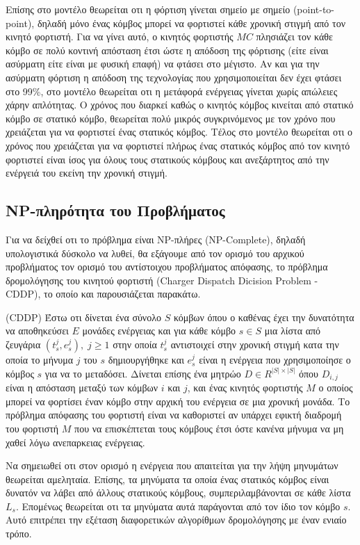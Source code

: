 Επίσης στο μοντέλο θεωρείται οτι η φόρτιση γίνεται σημείο με σημείο (point-to-point), δηλαδή μόνο ένας κόμβος μπορεί να φορτιστεί κάθε χρονική στιγμή από τον κινητό
φορτιστή. Για να γίνει αυτό, ο κινητός φορτιστής $MC$ πλησιάζει τον κάθε κόμβο σε πολύ κοντινή απόσταση έτσι ώστε η απόδοση της φόρτισης (είτε είναι ασύρματη είτε
είναι με φυσική επαφή) να φτάσει στο μέγιστο. Αν και για την ασύρματη φόρτιση η απόδοση της τεχνολογίας που χρησιμοποιείται δεν έχει φτάσει στο 99\%, στο μοντέλο
θεωρείται οτι η μετάφορά ενέργειας γίνεται χωρίς απώλειες χάρην απλότητας. Ο χρόνος που διαρκεί καθώς ο κινητός κόμβος κινείται από στατικό κόμβο σε στατικό κόμβο,
θεωρείται πολύ μικρός συγκρινόμενος με τον χρόνο που χρειάζεται για να φορτιστεί ένας στατικός κόμβος. Τέλος στο μοντέλο θεωρείται οτι ο χρόνος που χρειάζεται για να
φορτιστεί πλήρως ένας στατικός κόμβος από τον κινητό φορτιστεί είναι ίσος για όλους τους στατικούς κόμβους και ανεξάρτητος από την ενέργειά του εκείνη την χρονική
στιγμή.


\subsection{NP-πληρότητα του Προβλήματος}
Για να δείχθεί οτι το πρόβλημα είναι NP-πλήρες (NP-Complete), δηλαδή υπολογιστικά δύσκολο να λυθεί, θα εξάγουμε από τον ορισμό του αρχικού προβλήματος τον ορισμό του
αντίστοιχου προβλήματος απόφασης, το πρόβλημα δρομολόγησης του κινητού φορτιστή  (Charger Dispatch Dicision Problem - CDDP), το οποίο και παρουσιάζεται παρακάτω.

\begin{definition}
(CDDP) Έστω οτι δίνεται ένα σύνολο $S$ κόμβων όπου ο καθένας έχει την δυνατότητα να αποθηκεύσει $E$ μονάδες ενέργειας και για κάθε κόμβο $s\in S$ μια λίστα από
ζευγάρια $(t_{s}^{j}, e_{s}^{j}),\; j\geq 1$ στην οποία $t_{s}^{j}$ αντιστοιχεί στην χρονική στιγμή κατα την οποία το μήνυμα $j$ του $s$ δημιουργήθηκε και $e^{j}_{s}$
είναι η ενέργεια που χρησιμοποίησε ο κόμβος $s$ για να το μεταδόσει. Δίνεται επίσης ένα μητρώο $D\in R^{|S|\times |S|}$ όπου $D_{i,j}$ είναι η απόσταση μεταξύ των
κόμβων $i$ και $j$, και ένας κινητός φορτιστής $M$ ο οποίος μπορεί να φορτίσει έναν κόμβο στην αρχική του ενέργεια σε μια χρονική μονάδα. Το πρόβλημα απόφασης του
φορτιστή είναι να  καθοριστεί αν υπάρχει εφικτή διαδρομή του φορτιστή $M$ που να επισκέπτεται τους κόμβους έτσι όστε κανένα μήνυμα να μη χαθεί λόγω ανεπαρκειας
ενέργειας.
\end{definition}
Να σημειωθεί οτι στον ορισμό η ενέργεια που απαιτείται για την λήψη μηνυμάτων θεωρείται αμεληταία. Επίσης, τα μηνύματα τα οποία ένας στατικός κόμβος είναι δυνατόν να
λάβει από άλλους στατικούς κόμβους, συμπεριλαμβάνονται σε κάθε λίστα $L_{s}$. Επομένως θεωρείται οτι τα μηνύματα αυτά παράγονται από τον ίδιο τον κόμβο $s$. Αυτό
επιτρέπει την εξέταση διαφορετικών αλγορίθμων δρομολόγησης με έναν ενιαίο τρόπο.

